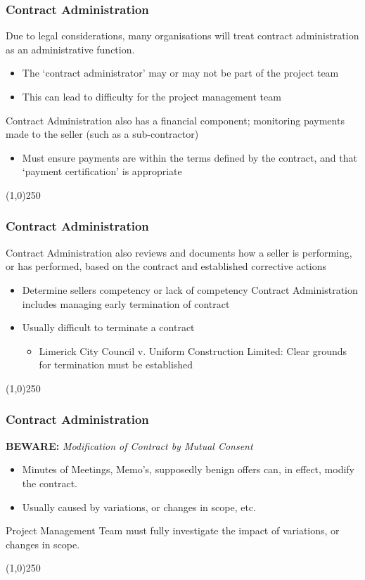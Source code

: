 \begin{frame}
\frametitle{Contract Administration}
Due to legal considerations, many organisations will treat contract administration as an administrative function.\\
\begin{itemize}
	\item The `contract administrator' may or may not be part of the project team
	\item This can lead to difficulty for the project management team
\end{itemize}
Contract Administration also has a financial component; monitoring payments made to the seller (such as a sub-contractor)
\begin{itemize}
	\item Must ensure payments are within the terms defined by the contract, and that `payment certification' is appropriate
\end{itemize}
\end{frame}\begin{center}\line(1,0){250}\end{center}



\begin{frame}
\frametitle{Contract Administration}
Contract Administration also reviews and documents how a seller is performing, or has performed, based on the contract and established corrective actions
\begin{itemize}
	\item Determine sellers competency or lack of competency
Contract Administration includes managing early termination of contract
	\item Usually difficult to terminate a contract
	\begin{itemize}
	\item Limerick City Council v. Uniform Construction Limited: Clear grounds for termination must be established 
	\end{itemize}
\end{itemize}
\end{frame}\begin{center}\line(1,0){250}\end{center}



\begin{frame}
\frametitle{Contract Administration}
\textbf{BEWARE:}
\textit{Modification of Contract by Mutual Consent}
\begin{itemize}
	\item Minutes of Meetings, Memo's, supposedly benign offers can, in effect, modify the contract.
	\item Usually caused by variations, or changes in scope, etc.
\end{itemize}
Project Management Team must fully investigate the impact of variations, or changes in scope. 
\end{frame}\begin{center}\line(1,0){250}\end{center}



